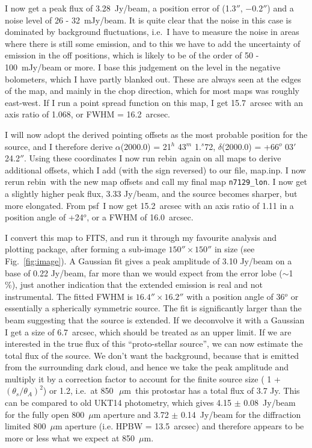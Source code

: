 \documentclass[twoside,11pt]{article}
\newcommand{\mic}{\mbox{\,${\mu}$m}}               %
\newcommand{\task}[1]{\textsf{#1}}
\newcommand{\rebin}{\xref{\task{rebin}}{sun216}{REBIN}}
\newcommand{\psf}{\xref{\task{psf}}{sun95}{PSF}}
\newcommand{\xref}[3]{#1}
\begin{document}
{I now get a peak flux of 3.28~Jy/beam, a position error of
(1.3$''$, $-0.2''$) and a noise level of 26 - 32~mJy/beam. It is quite clear
that the noise in this case is dominated by background fluctuations,
i.e.\ I have to measure the noise in areas where there is still some
emission, and to this we have to add the uncertainty of emission in
the off positions, which is likely to be of the order of 50 -
100~mJy/beam or more. I base this judgement on the level in the negative
bolometers, which I have partly blanked out. These are always seen at
the edges of the map, and mainly in the chop direction, which for most
maps was roughly east-west. If I run a point spread function on this map,
I get 15.7~arcsec with an axis ratio of 1.068, or FWHM = 16.2~arcsec.

I will now adopt the derived pointing offsets as the most probable
position for the source, and I therefore derive $\alpha$(2000.0) =
21$^h$ 43$^m$ 1.$^s$72, $\delta$(2000.0) = +66$^o$ 03$'$ 24.2$''$. Using
these coordinates I now run \rebin\ again on all maps to derive
additional offsets, which I add (with the sign reversed) to our file,
map.inp. I now rerun \rebin\ with the new map offsets and call my
final map \texttt{n7129\_lon}. I now get a slightly higher peak flux, 3.33
Jy/beam, and the source becomes sharper, but more elongated. From
\psf\ I now get 15.2~arcsec with an axis ratio of 1.11 in a position angle of
+24$^o$, or a FWHM of 16.0~arcsec.

I convert this map to FITS, and run it through my favourite analysis and
plotting package, after forming a sub-image $150''\times 150''$ in size (see
Fig.\ \ref{fig:image}). A Gaussian fit gives a peak amplitude of 3.10 Jy/beam
on a base of 0.22 Jy/beam, far more than we would expect from the error lobe
($\sim$1 \%), just another indication that the extended emission is real and
not instrumental. The fitted FWHM is $16.4'' \times 16.2''$ with a position
angle of 36$^o$ or essentially a spherically symmetric source. The fit is
significantly larger than the beam suggesting that the source is extended. If
we deconvolve it with a Gaussian I get a size of 6.7~arcsec, which should be
treated as an upper limit.  If we are interested in the true flux of this
``proto-stellar source'', we can now estimate the total flux of the source. We
don't want the background, because that is emitted from the surrounding dark
cloud, and hence we take the peak amplitude and multiply it by a correction
factor to account for the finite source size ( 1 + $(\theta_s/\theta_A)^2$) or
1.2, i.e.\ at 850~\mic\ this protostar has a total flux of 3.7 Jy. This can be
compared to old UKT14 photometry, which gives 4.15 $\pm$ 0.08~Jy/beam for the
fully open 800~$\mu$m aperture and 3.72 $\pm$ 0.14~Jy/beam for the diffraction
limited 800~$\mu$m aperture (i.e. HPBW = 13.5~arcsec) and therefore appears to
be more or less what we expect at 850~$\mu$m.


}
\end{document}
